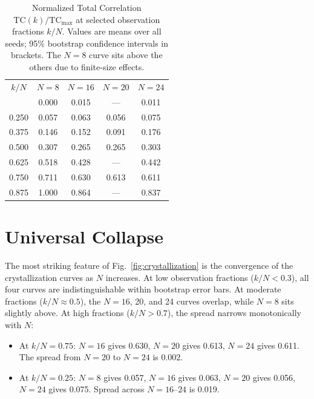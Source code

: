 \documentclass[aps,pra,twocolumn,superscriptaddress,floatfix]{revtex4-2}
\begin{document}
\begin{table}[t]
\caption{Normalized Total Correlation $\mathrm{TC}(k)/\mathrm{TC}_{\mathrm{max}}$ at selected observation fractions $k/N$. Values are means over all seeds; 95\% bootstrap confidence intervals in brackets. The $N = 8$ curve sits above the others due to finite-size effects.}
\label{tab:results}
\begin{ruledtabular}
\begin{tabular}{ccccc}
$k/N$ & $N=8$ & $N=16$ & $N=20$ & $N=24$ \\
\colrule
0.125 & 0.000 & 0.015 & --- & 0.011 \\
0.250 & 0.057 & 0.063 & 0.056 & 0.075 \\
0.375 & 0.146 & 0.152 & 0.091 & 0.176 \\
0.500 & 0.307 & 0.265 & 0.265 & 0.303 \\
0.625 & 0.518 & 0.428 & --- & 0.442 \\
0.750 & 0.711 & 0.630 & 0.613 & 0.611 \\
0.875 & 1.000 & 0.864 & --- & 0.837 \\
\end{tabular}
\end{ruledtabular}
\end{table}


\section{Universal Collapse}
\label{sec:collapse}

The most striking feature of Fig.~\ref{fig:crystallization} is the convergence of the crystallization curves as $N$ increases.
At low observation fractions ($k/N < 0.3$), all four curves are indistinguishable within bootstrap error bars.
At moderate fractions ($k/N \approx 0.5$), the $N = 16$, 20, and 24 curves overlap, while $N = 8$ sits slightly above.
At high fractions ($k/N > 0.7$), the spread narrows monotonically with $N$:

\begin{itemize}
\item At $k/N = 0.75$: $N = 16$ gives 0.630, $N = 20$ gives 0.613, $N = 24$ gives 0.611. The spread from $N = 20$ to $N = 24$ is 0.002.
\item At $k/N = 0.25$: $N = 8$ gives 0.057, $N = 16$ gives 0.063, $N = 20$ gives 0.056, $N = 24$ gives 0.075. Spread across $N = 16$--$24$ is 0.019.
\end{itemize}
\end{document}
